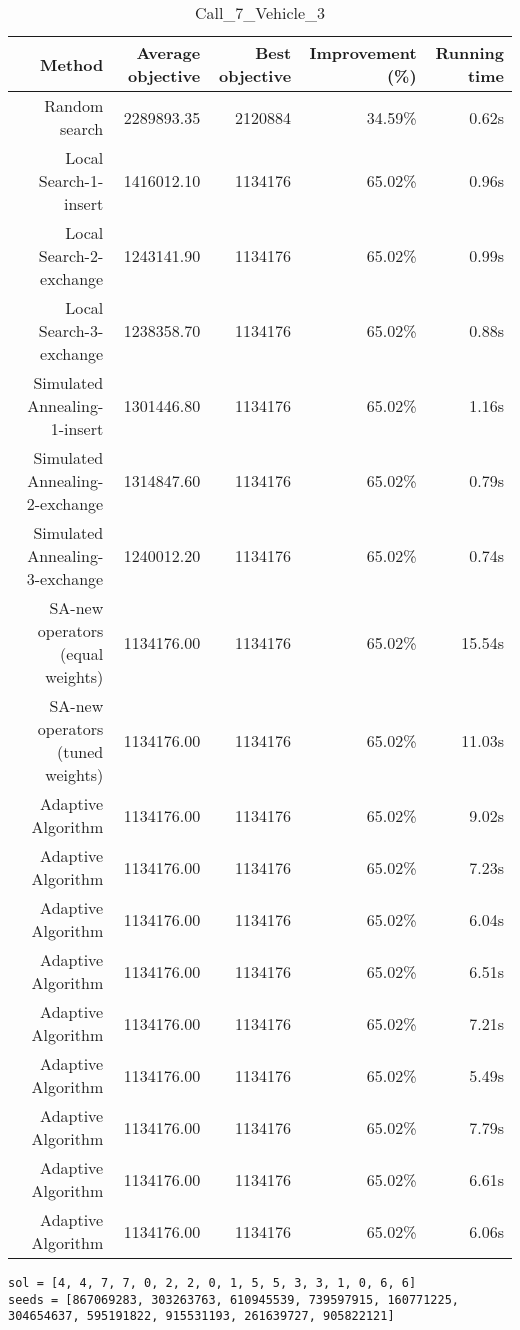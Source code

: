 \begin{table}[ht]
\centering
\caption{Call\_7\_Vehicle\_3}
\label{tab:call7vehicle3}
\begin{tabular}{|r|r|r|r|r|}
Method & Average objective & Best objective & Improvement (\%) & Running time \\
\hline
Random search & 2289893.35 & 2120884 & 34.59\% & 0.62s\\
Local Search-1-insert & 1416012.10 & 1134176 & 65.02\% & 0.96s\\
Local Search-2-exchange & 1243141.90 & 1134176 & 65.02\% & 0.99s\\
Local Search-3-exchange & 1238358.70 & 1134176 & 65.02\% & 0.88s\\
Simulated Annealing-1-insert & 1301446.80 & 1134176 & 65.02\% & 1.16s\\
Simulated Annealing-2-exchange & 1314847.60 & 1134176 & 65.02\% & 0.79s\\
Simulated Annealing-3-exchange & 1240012.20 & 1134176 & 65.02\% & 0.74s\\
SA-new operators (equal weights) & 1134176.00 & 1134176 & 65.02\% & 15.54s\\
SA-new operators (tuned weights) & 1134176.00 & 1134176 & 65.02\% & 11.03s\\
Adaptive Algorithm & 1134176.00 & 1134176 & 65.02\% & 9.02s\\
Adaptive Algorithm & 1134176.00 & 1134176 & 65.02\% & 7.23s\\
Adaptive Algorithm & 1134176.00 & 1134176 & 65.02\% & 6.04s\\
Adaptive Algorithm & 1134176.00 & 1134176 & 65.02\% & 6.51s\\
Adaptive Algorithm & 1134176.00 & 1134176 & 65.02\% & 7.21s\\
Adaptive Algorithm & 1134176.00 & 1134176 & 65.02\% & 5.49s\\
Adaptive Algorithm & 1134176.00 & 1134176 & 65.02\% & 7.79s\\
Adaptive Algorithm & 1134176.00 & 1134176 & 65.02\% & 6.61s\\
Adaptive Algorithm & 1134176.00 & 1134176 & 65.02\% & 6.06s\\
\end{tabular}%
\end{table}
\begin{lstlisting}[label={lst:call7vehicle3},caption=Optimal solution call\_7\_vehicle\_3]
sol = [4, 4, 7, 7, 0, 2, 2, 0, 1, 5, 5, 3, 3, 1, 0, 6, 6]
seeds = [867069283, 303263763, 610945539, 739597915, 160771225, 304654637, 595191822, 915531193, 261639727, 905822121]
\end{lstlisting}%
\clearpage


